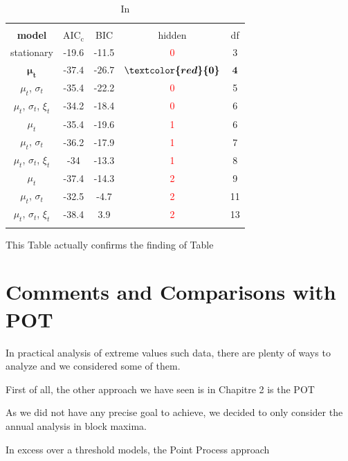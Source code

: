 \begin{table}[!htbp] 
	\centering \caption{In} 
	\vspace{-.1cm}
	\label{tab:comp_mod} 
	\begin{tabular}{@{\extracolsep{5pt}} ccccc} 
		\\[-1.8ex]\hline 
		\hline  \\[-1.8ex] 
 			\textbf{model} & $\text{AIC}_{\text{c}}$ & BIC & hidden & df \\
 			\hline
 			stationary & -19.6 & -11.5 & \textcolor{red}{0} & 3 \\
 			$\boldsymbol{\mu_t}$ & -$\boldsymbol{37.4}$ & -$\boldsymbol{26.7}$ & $\boldsymbol{\textcolor{red}{0}}$ & $\boldsymbol{4}$  \\
 			$\mu_t$, $\sigma_t$ & -35.4 & -22.2 & \textcolor{red}{0} & 5 \\
 			$\mu_t$, $\sigma_t$, $\xi_t$ & -34.2 & -18.4 & \textcolor{red}{0} & 6 \\
 			$\mu_t$ & -35.4 & -19.6 & \textcolor{red}{1} & 6 \\
 			$\mu_t$, $\sigma_t$ &  -36.2  & -17.9 & \textcolor{red}{1} & 7 \\ 
 			$\mu_t$, $\sigma_t$, $\xi_t$ & -34 & -13.3 & \textcolor{red}{1} & 8 \\
 			$\mu_t$ & -37.4 & -14.3 & \textcolor{red}{2} & 9 \\
 			$\mu_t$, $\sigma_t$ & -32.5 & -4.7 & \textcolor{red}{2} & 11 \\
 			$\mu_t$, $\sigma_t$, $\xi_t$ & -38.4 & 3.9 & \textcolor{red}{2} & 13 \\
 			\hline \\[-1.8ex] 
 \end{tabular}
 	\vspace{-.3cm}
\end{table} 

This Table actually confirms the finding of Table 

 	
\section{Comments and Comparisons with POT}

In practical analysis of extreme values such data, there are plenty of ways to analyze and we considered
some of them.

First of all, the other approach we have seen is in Chapitre 2 is the POT

As we did not have any precise goal to achieve, we decided to only consider the annual analysis in
block maxima.

In excess over a threshold models, the Point Process approach